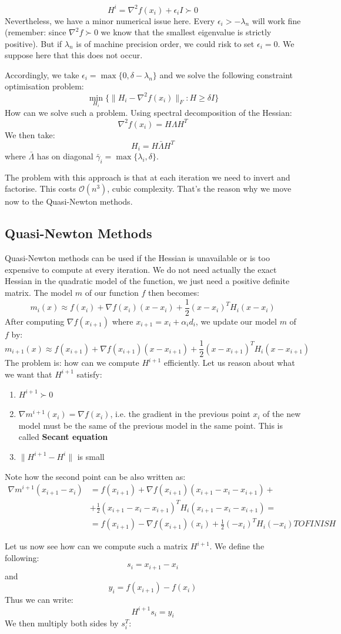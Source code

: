 \[
    H^i = \nabla ^ 2 f(x_i) + \epsilon_i I \succ 0
\]
Nevertheless, we have a minor numerical issue here. Every $\epsilon_i > - \lambda_n$ will work fine (remember: since $\nabla ^2 f \succ 0$ we know that the smallest eigenvalue is strictly positive). But if $\lambda_n$ is of machine precision order, we could risk to set $\epsilon_i = 0$. We suppose here that this does not occur.
\par Accordingly, we take $\epsilon_i = \max \{0, \delta - \lambda_n\}$ and we solve the following constraint optimisation problem:
\[
    \min_{H_i}\{\lVert H_i - \nabla ^ 2 f(x_i) \rVert_{F} :  H \geq \delta I\}
\]
How can we solve such a problem. Using spectral decomposition of the Hessian:
\[
    \nabla ^ 2 f(x_i) = H \Lambda H^T
\]
We then take:
\[
    H_i = H \bar{\Lambda} H^T
\]
where $\bar{\Lambda}$ has on diagonal $\bar{\gamma}_i = \max \{\lambda_i, \delta\}$.
\par The problem with this approach is that at each iteration we need to invert and factorise. This costs $\mathcal{O}(n^3)$, cubic complexity. That's the reason why we move now to the Quasi-Newton methods.
%
%
%
\subsection{Quasi-Newton Methods}
Quasi-Newton methods can be used if the Hessian is unavailable or is too expensive to compute at every iteration. We do not need actually the exact Hessian in the quadratic model of the function, we just need a positive definite matrix. The model $m$ of our function $f$ then becomes:
\[
    m_i(x) \approx f(x_i) + \nabla f(x_i) (x-x_i) + \frac{1}{2} (x-x_i)^T H_i (x-x_i)
\]
After computing $\nabla f(x_{i+1})$ where $x_{i+1} = x_i + \alpha_i d_i$, we update our model $m$ of $f$ by:
\[
    m_{i+1}(x) \approx f(x_{i+1}) + \nabla f(x_{i+1}) (x-x_{i+1}) + \frac{1}{2} (x-x_{i+1})^T H_i (x-x_{i+1})
\]
The problem is: how can we compute $H^{i+1}$ efficiently. Let us reason about what we want that $H^{i+1}$ satisfy:
\begin{enumerate}
    \item $H^{i+1} \succ 0$
    \item $\nabla m^{i+1}(x_i) = \nabla f(x_i)$, i.e. the gradient in the previous point $x_i$ of the new model must be the same of the previous model in the same point. This is called \textbf{Secant equation}
    \item $\lVert H^{i+1} - H^i \rVert$ is small
\end{enumerate}
Note how the second point can be also written as:
\begin{align*}
    \nabla m^{i+1}(x_{i+1} - x_i) &= f(x_{i+1}) + \nabla f(x_{i+1}) (x_{i+1} - x_i - x_{i+1}) +\\
    &+\frac{1}{2} (x_{i+1} - x_i -x_{i+1})^T H_i (x_{i+1} - x_i -x_{i+1}) =\\
    & = f(x_{i+1}) - \nabla f(x_{i+1}) (x_i) + \frac{1}{2} (- x_i)^T H_i (- x_i) TO FINISH
\end{align*}
\par Let us now see how can we compute such a matrix $H^{i+1}$. We define the following:
\[
    s_i = x_{i+1} - x_i
\]
and
\[
    y_i = f(x_{i+1}) - f(x_i)
\]
Thus we can write:
\[
    H^{i+1}s_i = y_i
\]
We then multiply both sides by $s_i^T$:

